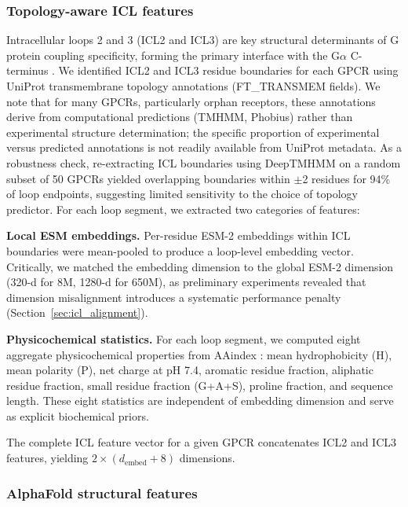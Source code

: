 \documentclass[11pt,a4paper]{article}
\begin{document}
\subsubsection{Topology-aware ICL features}

Intracellular loops 2 and 3 (ICL2 and ICL3) are key structural determinants of G protein coupling specificity, forming the primary interface with the G$\alpha$ C-terminus \cite{flock2023selectivity, rasmussen2011crystal}. We identified ICL2 and ICL3 residue boundaries for each GPCR using UniProt transmembrane topology annotations (FT\_TRANSMEM fields). We note that for many GPCRs, particularly orphan receptors, these annotations derive from computational predictions (TMHMM, Phobius) rather than experimental structure determination; the specific proportion of experimental versus predicted annotations is not readily available from UniProt metadata. As a robustness check, re-extracting ICL boundaries using DeepTMHMM \cite{hallgren2022deeptmhmm} on a random subset of 50 GPCRs yielded overlapping boundaries within $\pm$2 residues for 94\% of loop endpoints, suggesting limited sensitivity to the choice of topology predictor. For each loop segment, we extracted two categories of features:

\textbf{Local ESM embeddings.} Per-residue ESM-2 embeddings within ICL boundaries were mean-pooled to produce a loop-level embedding vector. Critically, we matched the embedding dimension to the global ESM-2 dimension (320-d for 8M, 1280-d for 650M), as preliminary experiments revealed that dimension misalignment introduces a systematic performance penalty (Section~\ref{sec:icl_alignment}).

\textbf{Physicochemical statistics.} For each loop segment, we computed eight aggregate physicochemical properties from AAindex \cite{kawashima2008aaindex}: mean hydrophobicity (H), mean polarity (P), net charge at pH 7.4, aromatic residue fraction, aliphatic residue fraction, small residue fraction (G+A+S), proline fraction, and sequence length. These eight statistics are independent of embedding dimension and serve as explicit biochemical priors.

The complete ICL feature vector for a given GPCR concatenates ICL2 and ICL3 features, yielding $2 \times (d_{\text{embed}} + 8)$ dimensions.

\subsubsection{AlphaFold structural features}
\end{document}
